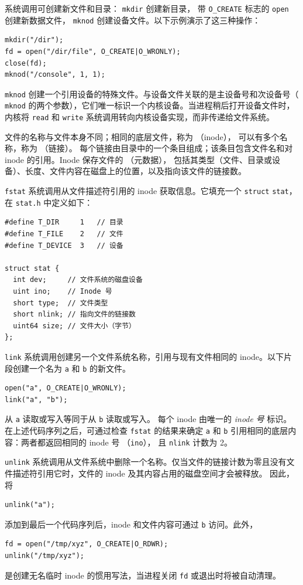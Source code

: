 系统调用可创建新文件和目录：
\lstinline{mkdir}
创建新目录，
带
\lstinline{O_CREATE}
标志的
\lstinline{open}
创建新数据文件，
\lstinline{mknod}
创建设备文件。以下示例演示了这三种操作：
\begin{lstlisting}[]
mkdir("/dir");
fd = open("/dir/file", O_CREATE|O_WRONLY);
close(fd);
mknod("/console", 1, 1);
\end{lstlisting}
\lstinline{mknod}
创建一个引用设备的特殊文件。与设备文件关联的是主设备号和次设备号（
\lstinline{mknod}
的两个参数），它们唯一标识一个内核设备。当进程稍后打开设备文件时，内核将
\lstinline{read}
和
\lstinline{write}
系统调用转向内核设备实现，而非传递给文件系统。

文件的名称与文件本身不同；相同的底层文件，称为
（inode），
可以有多个名称，称为
（链接）。
每个链接由目录中的一个条目组成；该条目包含文件名和对 inode 的引用。Inode 保存文件的
（元数据），
包括其类型（文件、目录或设备）、长度、文件内容在磁盘上的位置，以及指向该文件的链接数。

\lstinline{fstat}
系统调用从文件描述符引用的 inode 获取信息。它填充一个
\lstinline{struct}
\lstinline{stat}，
在
\lstinline{stat.h} 
中定义如下：
\begin{lstlisting}[]
#define T_DIR     1   // 目录
#define T_FILE    2   // 文件
#define T_DEVICE  3   // 设备

struct stat {
  int dev;     // 文件系统的磁盘设备
  uint ino;    // Inode 号
  short type;  // 文件类型
  short nlink; // 指向文件的链接数
  uint64 size; // 文件大小（字节）
};
\end{lstlisting}

\lstinline{link}
系统调用创建另一个文件系统名称，引用与现有文件相同的 inode。以下片段创建一个名为
\lstinline{a}
和
\lstinline{b}
的新文件。
\begin{lstlisting}[]
open("a", O_CREATE|O_WRONLY);
link("a", "b");
\end{lstlisting}
从
\lstinline{a}
读取或写入等同于从
\lstinline{b}
读取或写入。
每个 inode 由唯一的
\textit{inode}
\textit{号}
标识。在上述代码序列之后，可通过检查
\lstinline{fstat}
的结果来确定
\lstinline{a}
和
\lstinline{b}
引用相同的底层内容：两者都返回相同的 inode 号
（\lstinline{ino}），
且
\lstinline{nlink}
计数为 2。

\lstinline{unlink}
系统调用从文件系统中删除一个名称。仅当文件的链接计数为零且没有文件描述符引用它时，文件的 inode 及其内容占用的磁盘空间才会被释放。
因此，将
\begin{lstlisting}[]
unlink("a");
\end{lstlisting}
添加到最后一个代码序列后，inode 和文件内容可通过
\lstinline{b}
访问。此外，
\begin{lstlisting}[]
fd = open("/tmp/xyz", O_CREATE|O_RDWR);
unlink("/tmp/xyz");
\end{lstlisting}
是创建无名临时 inode 的惯用写法，当进程关闭
\lstinline{fd}
或退出时将被自动清理。

